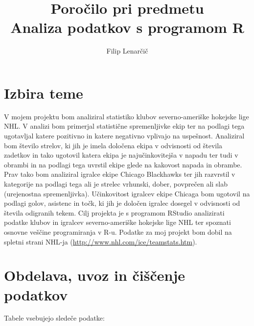 \documentclass[11pt,a4paper]{article}
\begin{document}
\title{Poročilo pri predmetu \\
Analiza podatkov s programom R}
\author{Filip Lenarčič}
\maketitle

\section{Izbira teme}

V mojem projektu bom analiziral statistiko klubov severno-ameriške hokejske lige NHL.  V analizi bom primerjal statistične spremenljivke ekip ter na podlagi tega ugotavljal katere pozitivno in katere negativno vplivajo na uspešnost. Analiziral bom število strelov, ki jih je imela določena ekipa v odvisnosti od števila zadetkov in tako ugotovil katera ekipa je najučinkovitejša v napadu ter tudi v obrambi in na podlagi tega uvrstil ekipe glede na kakovost napada in obrambe. Prav tako bom analiziral igralce ekipe Chicago Blackhawks ter jih razvrstil v kategorije na podlagi tega ali je strelec vrhunski, dober, povprečen ali slab (urejenostna spremenljivka).  Učinkovitost igralcev ekipe Chicaga bom ugotovil na podlagi golov, asistenc in točk, ki jih je določen igralec dosegel v odvisnosti od števila odigranih tekem.
Cilj projekta je s programom RStudio analizirati podatke klubov in igralcev severno-ameriške hokejske lige NHL ter spoznati osnovne veščine programiranja v R-u. Podatke za moj projekt bom dobil na spletni strani NHL-ja (\url{http://www.nhl.com/ice/teamstats.htm}).


\section{Obdelava, uvoz in čiščenje podatkov}

Tabele vsebujejo sledeče podatke:
\end{document}
